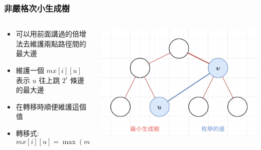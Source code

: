 \documentclass[aspectratio=169]{beamer}
\begin{document}
    \begin{frame}
        \frametitle{非嚴格次小生成樹}
        \begin{columns}
            \begin{column}{0.65 \textwidth}
                \begin{itemize}
                    \item 可以用前面講過的倍增法去維護兩點路徑間的最大邊
                    \item 維護一個 $mx[i][u]$ 表示 $u$ 往上跳 $2^i$ 條邊的最大邊
                    \item 在轉移時順便維護這個值
                    \item 轉移式: $$mx[i][u] = \max(mx[i-1][u], mx[i-1][p[i-1][u]])$$
                \end{itemize}
            \end{column}
            \begin{column}{0.4 \textwidth}
                \begin{center}
                    \includegraphics[scale=0.2]{images/find_smst.png}
                \end{center}
            \end{column}
        \end{columns}
    \end{frame}
   
\end{document}
